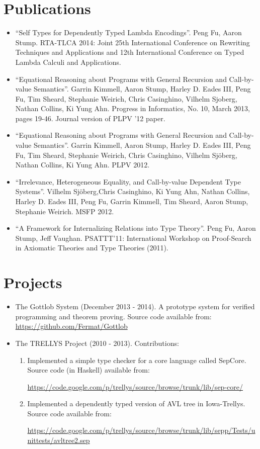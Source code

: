 \documentclass[11pt]{article}
\begin{document}
\section*{Publications}

\begin{itemize}
  \item ``Self Types for Dependently Typed Lambda Encodings''. Peng Fu, Aaron Stump. RTA-TLCA 2014: Joint 25th International Conference on Rewriting Techniques and Applications and 12th International Conference on Typed Lambda Calculi and Applications. 
  \item ``Equational Reasoning about Programs with General Recursion and Call-by-value Semantics''. Garrin Kimmell, Aaron Stump, Harley D. Eades III, Peng Fu, Tim Sheard, Stephanie Weirich, Chris Casinghino, Vilhelm Sjoberg, Nathan Collins, Ki Yung Ahn. Progress in Informatics, No. 10, March 2013, pages 19-46. Journal version of PLPV '12 paper. 
\item ``Equational Reasoning about Programs with General Recursion and Call-by-value Semantics''. Garrin Kimmell, Aaron Stump, Harley D. Eades III, Peng Fu, Tim Sheard, Stephanie Weirich, Chris Casinghino, Vilhelm Sj\"oberg, Nathan Collins, Ki Yung Ahn. PLPV 2012. 
\item ``Irrelevance, Heterogeneous Equality, and Call-by-value Dependent Type Systems''. Vilhelm Sj\"oberg,Chris Casinghino, Ki Yung Ahn, Nathan Collins, Harley D. Eades III, Peng Fu, Garrin Kimmell, Tim Sheard, Aaron Stump, Stephanie Weirich. MSFP 2012.
\item ``A Framework for Internalizing Relations into Type Theory''. Peng Fu, Aaron Stump, Jeff Vaughan. PSATTT'11: International Workshop on Proof-Search in Axiomatic Theories and Type Theories (2011).
\end{itemize}

\section*{Projects}
\begin{itemize}
\item The Gottlob System (December 2013 - 2014). A prototype system for verified programming and theorem proving. Source code available from:  \url{https://github.com/Fermat/Gottlob}
\item The TRELLYS Project (2010 - 2013). Contributions: 
  \begin{enumerate}
  \item Implemented a simple type checker for a core language called SepCore. Source code (in Haskell) available from: 
    
    \noindent \url{https://code.google.com/p/trellys/source/browse/trunk/lib/sep-core/}
  \item Implemented a dependently typed version of AVL tree in Iowa-Trellys. Source code available from: 
    
    \noindent \url{https://code.google.com/p/trellys/source/browse/trunk/lib/sepp/Tests/unittests/avltree2.sep} 
  \end{enumerate}

\end{itemize}
\end{document}
